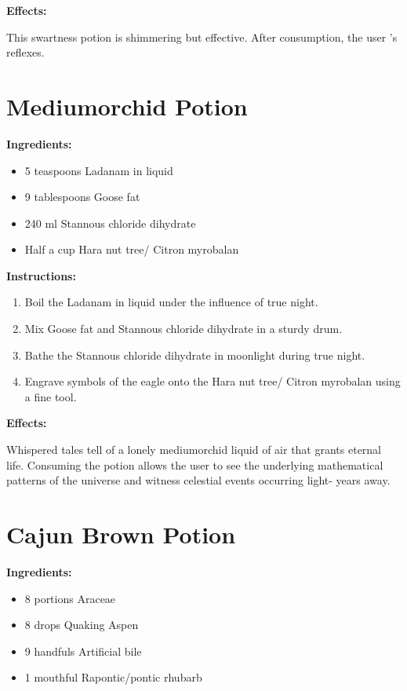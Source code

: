 \documentclass{article}
\begin{document}
\textbf{Effects:}

This swartness potion is shimmering but effective. After consumption, the user 's reflexes.

\newpage
\section*{Mediumorchid Potion}

\textbf{Ingredients:}

\begin{itemize}
  \item 5 teaspoons Ladanam in liquid
  \item 9 tablespoons Goose fat
  \item 240 ml Stannous chloride dihydrate
  \item Half a cup Hara nut tree/ Citron myrobalan
\end{itemize}

\textbf{Instructions:}

\begin{enumerate}
  \item Boil the Ladanam in liquid under the influence of true night.
  \item Mix Goose fat and Stannous chloride dihydrate in a sturdy drum.
  \item Bathe the Stannous chloride dihydrate in moonlight during true night.
  \item Engrave symbols of the eagle onto the Hara nut tree/ Citron myrobalan using a fine tool.
\end{enumerate}

\textbf{Effects:}

Whispered tales tell of a lonely mediumorchid liquid of air that grants eternal life. Consuming the potion allows the user to see the underlying mathematical patterns of the universe and witness celestial events occurring light- years away.

\newpage
\section*{Cajun Brown Potion}

\textbf{Ingredients:}

\begin{itemize}
  \item 8 portions Araceae
  \item 8 drops Quaking Aspen
  \item 9 handfuls Artificial bile
  \item 1 mouthful Rapontic/pontic rhubarb
\end{itemize}
\end{document}
